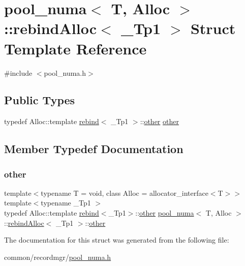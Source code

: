\hypertarget{structpool__numa_1_1rebindAlloc}{}\section{pool\+\_\+numa$<$ T, Alloc $>$\+:\+:rebind\+Alloc$<$ \+\_\+\+Tp1 $>$ Struct Template Reference}
\label{structpool__numa_1_1rebindAlloc}


{\ttfamily \#include $<$pool\+\_\+numa.\+h$>$}

\subsection*{Public Types}
\begin{DoxyCompactItemize}
\item 
typedef Alloc\+::template \hyperlink{structpool__numa_1_1rebind}{rebind}$<$ \+\_\+\+Tp1 $>$\+::\hyperlink{structpool__numa_1_1rebindAlloc_a9c536f5250fc40c978641ee58740394c}{other} \hyperlink{structpool__numa_1_1rebindAlloc_a9c536f5250fc40c978641ee58740394c}{other}
\end{DoxyCompactItemize}


\subsection{Member Typedef Documentation}
\mbox{\label{structpool__numa_1_1rebindAlloc_a9c536f5250fc40c978641ee58740394c}} 
\subsubsection{\texorpdfstring{other}{other}}
{\footnotesize\ttfamily template$<$typename T  = void, class Alloc  = allocator\+\_\+interface$<$\+T$>$$>$ \\
template$<$typename \+\_\+\+Tp1 $>$ \\
typedef Alloc\+::template \hyperlink{structpool__numa_1_1rebind}{rebind}$<$\+\_\+\+Tp1$>$\+::\hyperlink{structpool__numa_1_1rebindAlloc_a9c536f5250fc40c978641ee58740394c}{other} \hyperlink{classpool__numa}{pool\+\_\+numa}$<$ T, Alloc $>$\+::\hyperlink{structpool__numa_1_1rebindAlloc}{rebind\+Alloc}$<$ \+\_\+\+Tp1 $>$\+::\hyperlink{structpool__numa_1_1rebindAlloc_a9c536f5250fc40c978641ee58740394c}{other}}



The documentation for this struct was generated from the following file\+:\begin{DoxyCompactItemize}
\item 
common/recordmgr/\hyperlink{pool__numa_8h}{pool\+\_\+numa.\+h}\end{DoxyCompactItemize}
